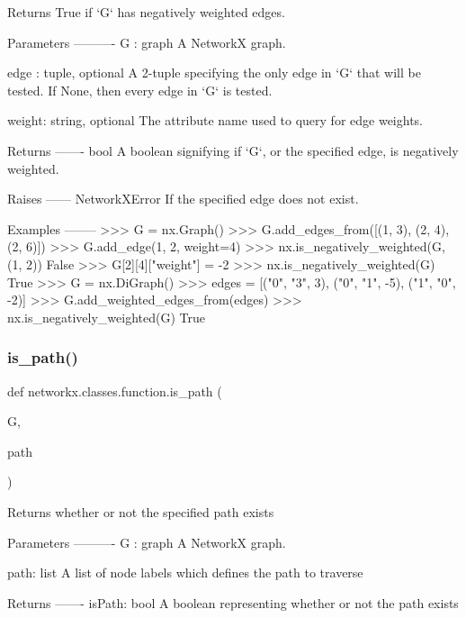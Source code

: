 \begin{DoxyVerb}Returns True if `G` has negatively weighted edges.

Parameters
----------
G : graph
    A NetworkX graph.

edge : tuple, optional
    A 2-tuple specifying the only edge in `G` that will be tested. If
    None, then every edge in `G` is tested.

weight: string, optional
    The attribute name used to query for edge weights.

Returns
-------
bool
    A boolean signifying if `G`, or the specified edge, is negatively
    weighted.

Raises
------
NetworkXError
    If the specified edge does not exist.

Examples
--------
>>> G = nx.Graph()
>>> G.add_edges_from([(1, 3), (2, 4), (2, 6)])
>>> G.add_edge(1, 2, weight=4)
>>> nx.is_negatively_weighted(G, (1, 2))
False
>>> G[2][4]["weight"] = -2
>>> nx.is_negatively_weighted(G)
True
>>> G = nx.DiGraph()
>>> edges = [("0", "3", 3), ("0", "1", -5), ("1", "0", -2)]
>>> G.add_weighted_edges_from(edges)
>>> nx.is_negatively_weighted(G)
True\end{DoxyVerb}
 \mbox{\label{namespacenetworkx_1_1classes_1_1function_aadf33b4db2b4b16c70e347646483f6a5}} 
\subsubsection{\texorpdfstring{is\+\_\+path()}{is\_path()}}
{\footnotesize\ttfamily def networkx.\+classes.\+function.\+is\+\_\+path (\begin{DoxyParamCaption}\item[{}]{G,  }\item[{}]{path }\end{DoxyParamCaption})}

\begin{DoxyVerb}Returns whether or not the specified path exists

Parameters
----------
G : graph
    A NetworkX graph.

path: list
    A list of node labels which defines the path to traverse

Returns
-------
isPath: bool
    A boolean representing whether or not the path exists\end{DoxyVerb}
 \mbox{\label{namespacenetworkx_1_1classes_1_1function_a69b85b7c8fc72a2ebc28f739c6364ad4}} 
